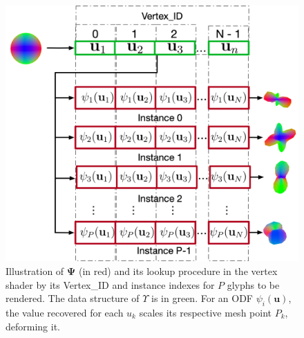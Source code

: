 \documentclass[twoside,twocolumn,10pt]{article}
\begin{document}
\begin{figure}[htb]
    \centering
    \includegraphics[width=1.0\linewidth, angle=0]{figs/rendering_scheme/GPU2Glyph.png}
    \caption{
    Illustration of $\bm{\Psi}$ (in red) and its lookup procedure in the vertex shader by its Vertex\_ID and instance indexes for $P$ glyphs to be rendered. The data structure of $\Upsilon$ is in green. For an ODF $\psi_i(\bm{u})$, the value recovered for each $u_k$ scales its respective mesh point $P_k$, deforming it.
    }
    \label{fig::GPU2glyph}
\end{figure}
\end{document}

